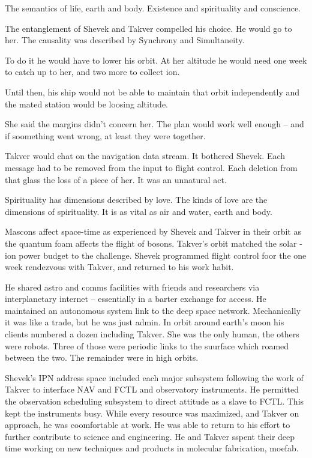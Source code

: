 
The semantics of life, earth and body.  Existence and spirituality and
conscience.  

The entanglement of Shevek and Takver compelled his choice.  He would
go to her.  The causality was described by Synchrony and Simultaneity.

To do it he would have to lower his orbit.  At her altitude he would
need one week to catch up to her, and two more to collect ion.

Until then, his ship would not be able to maintain that orbit
independently and the mated station would be loosing altitude.

She said the margins didn't concern her.  The plan would work well
enough -- and if soomething went wrong, at least they were together.


Takver would chat on the navigation data stream.  It bothered Shevek.
Each message had to be removed from the input to flight control.  Each
deletion from that glass the loss of a piece of her.  It was an
unnatural act.

Spirituality has dimensions described by love.  The kinds of love are
the dimensions of spirituality.  It is as vital as air and water,
earth and body.

Mascons affect space-time as experienced by Shevek and Takver in their
orbit as the quantum foam affects the flight of bosons.  Takver's
orbit matched the solar - ion power budget to the challenge.  Shevek
programmed flight control foor the one week rendezvous with Takver,
and returned to his work habit.

He shared astro and comms facilities with friends and researchers via
interplanetary internet -- essentially in a barter exchange for
access.  He maintained an autonomous system link to the deep space
network.  Mechanically it was like a trade, but he was just admin.  In
orbit around earth's moon his clients numbered a dozen including
Takver.  She was the only human, the others were robots.  Three of
those were periodic links to the suurface which roamed between the
two.  The remainder were in high orbits.

Shevek's IPN address space included each major subsystem following the
work of Takver to interface NAV and FCTL and observatory instruments.
He permitted the observation scheduling subsystem to direct attitude
as a slave to FCTL.  This kept the instruments busy.  While every
resource was maximized, and Takver on approach, he was coomfortable at
work.  He was able to return to his effort to further contribute to
science and engineering.  He and Takver sspent their deep time working
on new techniques and products in molecular fabrication, moefab.

